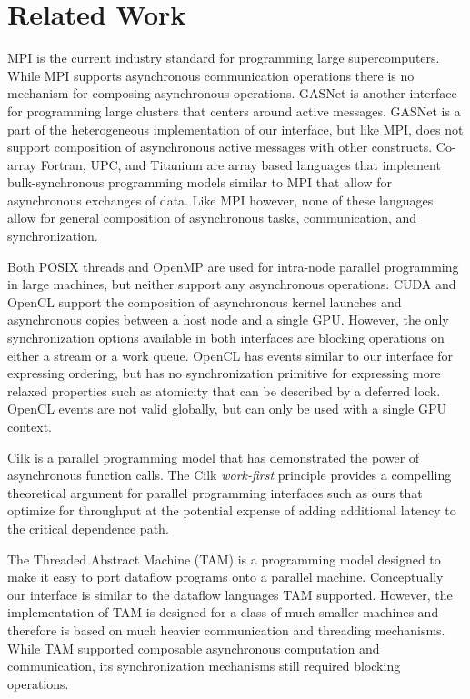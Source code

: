 
\section{Related Work}
\label{sec:related}

MPI is the current industry standard for programming large
supercomputers\cite{MPI}.  While MPI supports asynchronous
communication operations there is no mechanism for composing
asynchronous operations.  GASNet is another interface for programming
large clusters that centers around active messages\cite{GASNET07}.  GASNet
is a part of the heterogeneous implementation of our interface, but like
MPI, does not support composition of asynchronous active messages with
other constructs.  Co-array Fortran, UPC, and Titanium
are array based languages that implement bulk-synchronous
programming models similar to MPI that allow for asynchronous
exchanges of data\cite{COARRAY_FORTRAN,UPC99,JV:Yel98}.  Like
MPI however, none of these languages allow for general composition
of asynchronous tasks, communication, and synchronization.

Both POSIX threads and OpenMP\cite{OPENMP98} are used for intra-node parallel
programming in large machines, but neither support any asynchronous
operations.  CUDA\cite{CUDA} and OpenCL\cite{Khronos:OpenCL} support
the composition of asynchronous kernel launches and asynchronous copies
between a host node and a single GPU.  However, the only synchronization
options available in both interfaces are blocking operations on either
a stream or a work queue.  OpenCL has events similar to our interface for
expressing ordering, but has no synchronization primitive for expressing
more relaxed properties such as atomicity that can be described by a
deferred lock.  OpenCL events are not valid globally, but can only be
used with a single GPU context.

Cilk is a parallel programming model that has demonstrated the power of
asynchronous function calls\cite{CILK95}.  The Cilk {\em work-first}
principle provides a compelling theoretical argument for parallel programming
interfaces such as ours that optimize for throughput at the potential
expense of adding additional latency to the critical 
dependence path\cite{Frigo98}.

The Threaded Abstract Machine (TAM) is a programming model designed to
make it easy to port dataflow programs onto a parallel machine\cite{CullerGSvE93}.  
Conceptually our interface is similar to the dataflow languages TAM supported.
However, the implementation of TAM is designed for a class of much smaller machines
and therefore is based on much heavier communication and threading mechanisms.
While TAM supported composable asynchronous computation and communication, its
synchronization mechanisms still required blocking operations.

